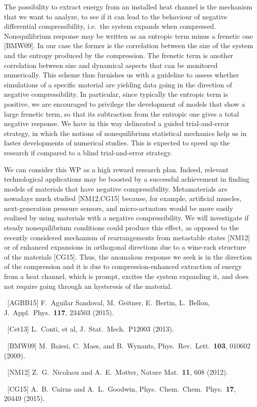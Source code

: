 \begin{workpackage}
\begin{wpdescription}
The possibility to extract energy from an installed heat channel is the mechanism that we want to
analyze, to see if it can lead to the behaviour of negative differential compressibility,
i.e.~the system expands when compressed. 
Nonequilibrium response may be written as an entropic term minus a frenetic one [BMW09].
In our case the former is the correlation between the size of the system and the entropy produced by the compression.
The frenetic term is another correlation between size and dynamical aspects that can be monitored numerically.
This scheme thus furnishes us with a guideline to assess whether simulations of a specific material are yielding data 
going in the direction of negative compressibility. In particular, since typically the entropic term is positive, we
are encouraged to privilege the development of models that show a large frenetic term, so that its subtraction from
the entropic one gives a total negative response.
We have in this way delineated a guided trial-and-error strategy, in which the notions of 
nonequilibrium statistical mechanics help us in faster developments of numerical studies. This is expected to
speed up the research if compared to a blind trial-and-error strategy.


We can consider this WP as a high reward research plan. Indeed, relevant technological applications
may be boosted by a successful achievement in finding models of materials that have negative compressibility.
Metamaterials are nowadays much studied [NM12,CG15] because, for example, artificial muscles, 
next-generation pressure sensors, and micro-actuators would be
more easily realized by using materials with a negative compressibility. We will investigate
if steady nonequilibrium conditions could produce this effect, as opposed to the recently considered 
mechanism of rearrangements from metastable states [NM12] or of enhanced expansions in orthogonal directions
due to a wine-rack structure of the materials [CG15]. Thus, the anomalous response we seek is in the direction 
of the compression and it is due to compression-enhanced extraction of energy from a heat channel,
which is prompt, excites the system expanding it, 
and does not require going through an hysteresis of the material. 

\begin{compactitem}
\item ~[AGBB15] F.~Aguilar Sandoval, M.~Geitner, E.~Bertin, L.~Bellon, J.~Appl.~Phys.~{\bf 117}, 234503 (2015).
\item ~[Cet13] L.~Conti, et al, J.~Stat.~Mech.~P12003 (2013).
\item ~[BMW09]  M.~Baiesi, C.~Maes,  and B.~Wynants, Phys.~Rev.~Lett.~{\bf 103}, 010602 (2009).
\item ~[NM12] Z.~G.~Nicolaou and A.~E.~Motter, Nature Mat.~{\bf 11}, 608 (2012).
\item ~[CG15] A.~B.~Cairns and A.~L.~Goodwin, Phys.~Chem.~Chem.~Phys.~{\bf 17}, 20449 (2015).
\end{compactitem}


\end{wpdescription}
\end{workpackage}
